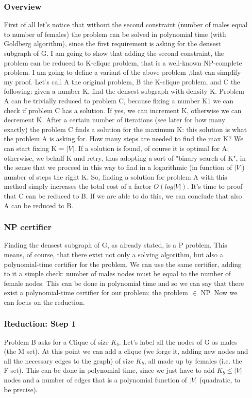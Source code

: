 \subsubsection{Overview}
First of all let's notice that without the second constraint (number of males equal to number of females) the problem can be solved in polynomial time (with Goldberg algorithm), since the first requirement is asking for the densest subgraph of G. I am going to show that adding the second constraint, the problem can be reduced to K-clique problem, that is a well-known NP-complete problem. I am going to define a variant of the above problem ,that can simplify my proof. Let's call A the original problem, B the K-clique problem, and C the following: given a number K, find the densest subgraph with density K.
Problem A can be trivially reduced to problem C, because fixing a number K1 we can check if problem C has a solution. If yes, we can increment K, otherwise we can decrement K. After a certain number of iterations (see later for how many exactly) the problem C finds a solution for the maximum K: this solution is what the problem A is asking for. How many steps are needed to find the max K? We can start fixing K = $|V|$. If a solution is found, of course it is optimal for A; otherwise, we behalf K and retry, thus adopting a sort of "binary search of K", in the sense that we proceed in this way to find in a logarithmic (in function of $|V|$) number of steps the right K. So, finding a solution for problem A with this method simply increases the total cost of a factor $O(log|V|)$. It's time to proof that C can be reduced to B. If we are able to do this, we can conclude that also A can be reduced to B.
\subsubsection{NP certifier}
Finding the densest subgraph of G, as already stated, is a P problem. This means, of course, that there exist not only a solving algorithm, but also a polynomial-time certifier for the problem. We can use the same certifier, adding to it a simple check: number of males nodes must be equal to the number of female nodes. This can be done in polynomial time and so we can say that there exist a polynomial-time certifier for our problem: the problem $\in$ NP. Now we can focus on the reduction.
\subsubsection{Reduction: Step 1}
Problem B asks for a Clique of size $K_b$. Let's label all the nodes of G as males (the M set). At this point we can add a clique (we forge it, adding new nodes and all the necessary edges to the graph) of size $K_b$, all made up by females (i.e. the F set). This can be done in polynomial time, since we just have to add $K_b \leq |V|$ nodes and a number of edges that is a polynomial function of $|V|$ (quadratic, to be precise). 

